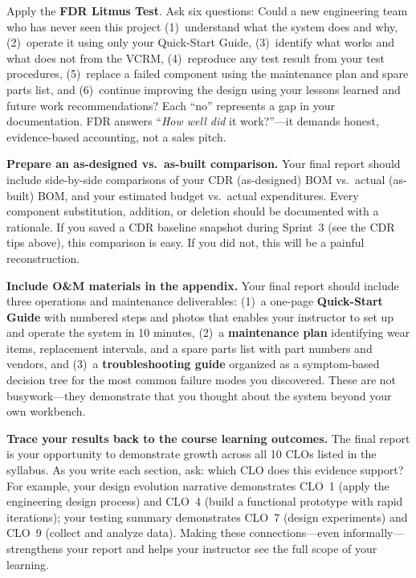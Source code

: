 \begin{faqbox}
Apply the \textbf{FDR Litmus Test}. Ask six questions: Could a new engineering team who has never seen this project (1)~understand what the system does and why, (2)~operate it using only your Quick-Start Guide, (3)~identify what works and what does not from the VCRM, (4)~reproduce any test result from your test procedures, (5)~replace a failed component using the maintenance plan and spare parts list, and (6)~continue improving the design using your lessons learned and future work recommendations? Each ``no'' represents a gap in your documentation. FDR answers ``\textit{How well did} it work?''---it demands honest, evidence-based accounting, not a sales pitch.
\end{faqbox}

\begin{protip}
\textbf{Prepare an as-designed vs.\ as-built comparison.} Your final report should include side-by-side comparisons of your CDR (as-designed) BOM vs.\ actual (as-built) BOM, and your estimated budget vs.\ actual expenditures. Every component substitution, addition, or deletion should be documented with a rationale. If you saved a CDR baseline snapshot during Sprint~3 (see the CDR tips above), this comparison is easy. If you did not, this will be a painful reconstruction.
\end{protip}

\begin{tipbox}
\textbf{Include O\&M materials in the appendix.} Your final report should include three operations and maintenance deliverables: (1)~a one-page \textbf{Quick-Start Guide} with numbered steps and photos that enables your instructor to set up and operate the system in 10 minutes, (2)~a \textbf{maintenance plan} identifying wear items, replacement intervals, and a spare parts list with part numbers and vendors, and (3)~a \textbf{troubleshooting guide} organized as a symptom-based decision tree for the most common failure modes you discovered. These are not busywork---they demonstrate that you thought about the system beyond your own workbench.
\end{tipbox}

\begin{protip}
\textbf{Trace your results back to the course learning outcomes.} The final report is your opportunity to demonstrate growth across all 10 CLOs listed in the syllabus. As you write each section, ask: which CLO does this evidence support? For example, your design evolution narrative demonstrates CLO~1 (apply the engineering design process) and CLO~4 (build a functional prototype with rapid iterations); your testing summary demonstrates CLO~7 (design experiments) and CLO~9 (collect and analyze data). Making these connections---even informally---strengthens your report and helps your instructor see the full scope of your learning.
\end{protip}

